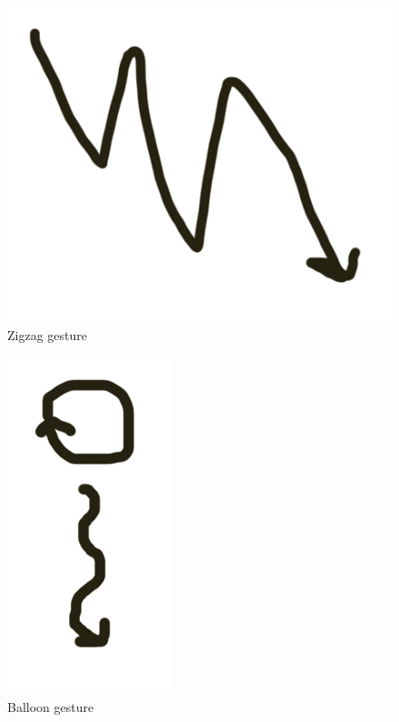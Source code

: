\documentclass[12pt]{article}
\begin{document}
\begin{figure}[h!]
\centering
\includegraphics[scale=0.4]{zigzag.png}
\caption{Zigzag gesture}
\end{figure}

\begin{figure}[h!]
\centering
\includegraphics[scale=0.4]{balloon.png}
\caption{Balloon gesture}
\end{figure}

\FloatBarrier
\end{document}
